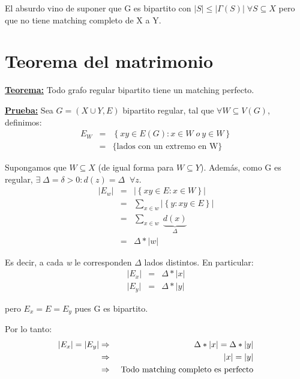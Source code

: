 \documentclass[12pt,a4paper]{report}
\begin{document}
			\par El absurdo vino de suponer que G es bipartito con $\lvert S \rvert \leq \lvert \Gamma(S) \rvert \; \forall S \subseteq X$ pero que no tiene matching completo de X a Y.


	\section{Teorema del matrimonio}
		\textbf{\underline{Teorema:}} Todo grafo regular bipartito tiene un matching perfecto.

		\textbf{\underline{Prueba:}} Sea $G = (X \cup Y, E)$ bipartito regular, tal que $\forall W \subseteq V(G)$, definimos:
			\begin{eqnarray}
				\nonumber E_{W} &=& \left\lbrace xy \in E(G): x \in W \; o \ y \in W \right\rbrace \\
				\nonumber &=& \lbrace \text{lados con un extremo en W} \rbrace
			\end{eqnarray}

			\par Supongamos que $W \subseteq X$ (de igual forma para $W \subseteq Y$). Además, como G es regular, $\exists \; \Delta  = \delta > 0 : d(z) = \Delta \; \; \forall z$.
			\begin{eqnarray}
				\nonumber \lvert E_{w} \rvert &=& \lvert \left\lbrace xy \in E: x \in W \right\rbrace \rvert \\
				\nonumber &=& \sum_{x \in w} \lvert \left\lbrace y : xy \in E \right\rbrace \rvert \\
				\nonumber &=& \sum_{x \in w} \; \underbrace{d(x)}_{\Delta} \\
				\nonumber &=& \Delta * \lvert w \rvert
			\end{eqnarray}

			\par Es decir, a cada \textit{w} le corresponden $\Delta$ lados distintos. En particular:
			\begin{eqnarray}
				\nonumber \lvert E_{x} \rvert &=& \Delta * \lvert x \rvert \\
				\nonumber \lvert E_{y} \rvert &=& \Delta * \lvert y \rvert
			\end{eqnarray}
			\par pero $E_{x} = E = E_{y}$ pues G es bipartito.

			\vspace{5mm}
			\par Por lo tanto:
			\begin{eqnarray}
				\nonumber \lvert E_{x} \rvert = \lvert E_{y} \rvert &\Rightarrow & \Delta * \lvert x \rvert = \Delta * \lvert y \rvert \\
				\nonumber &\Rightarrow & \lvert x \rvert = \lvert y \rvert \\
				\nonumber &\Rightarrow & \textup{ Todo matching completo es perfecto}
			\end{eqnarray}
\end{document}
